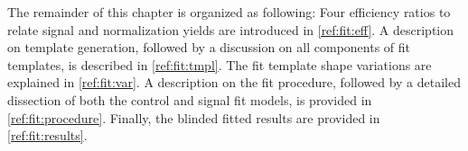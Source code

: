 The remainder of this chapter is organized as following:
Four efficiency ratios to relate signal and normalization yields are introduced
in \cref{ref:fit:eff}.
A description on template generation,
followed by a discussion on all components of fit templates,
is described in \cref{ref:fit:tmpl}.
The fit template shape variations are explained in
\cref{ref:fit:var}.
A description on the fit procedure, followed by a detailed dissection of both
the control and signal fit models,
is provided in \cref{ref:fit:procedure}.
Finally, the blinded fitted results are provided in
\cref{ref:fit:results}.







